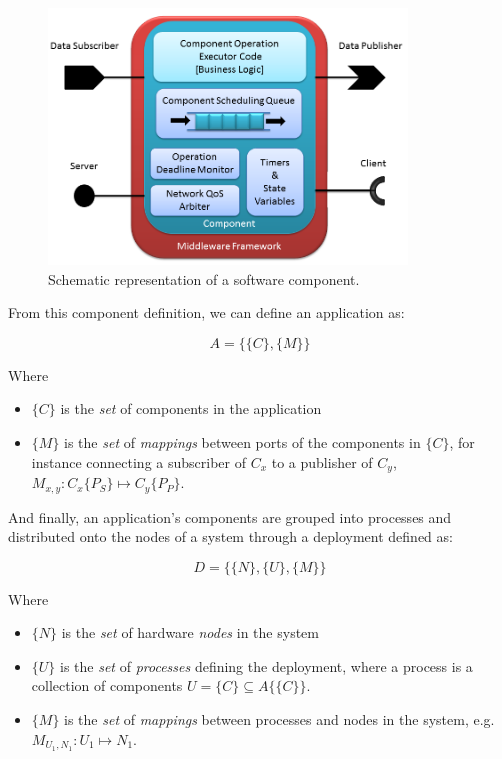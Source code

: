 \begin{figure}[ht!]
  \centering
  \includegraphics[width=0.85\textwidth]{../doc/src/images/results/ros_component.png}
  \caption{Schematic representation of a software component.}
  \label{fig:component}
\end{figure}

From this component definition, we can define an application as:

\begin{equation}
  A = \{\{C\},\{M\}\}
\end{equation}

Where

\begin{itemize}
\item $\{C\}$ is the \emph{set} of components in the application
\item $\{M\}$ is the \emph{set} of \emph{mappings} between ports of
  the components in $\{C\}$, for instance connecting a subscriber of
  $C_x$ to a publisher of $C_y$, $M_{x,y} : C_x\{P_S\}\mapsto
  C_y\{P_P\}$.
\end{itemize}

And finally, an application's components are grouped into processes
and distributed onto the nodes of a system through a deployment
defined as:

\begin{equation}
  D = \{\{N\},\{U\},\{M\}\}
\end{equation}

Where

\begin{itemize}
\item $\{N\}$ is the \emph{set} of hardware \emph{nodes} in the system
\item $\{U\}$ is the \emph{set} of \emph{processes} defining the deployment,
  where a process is a collection of components
  $U=\{C\}\subseteq A\{\{C\}\}$.
\item $\{M\}$ is the \emph{set} of \emph{mappings} between processes and nodes
  in the system, e.g. $M_{U_1,N_1} : U_1\mapsto N_1$.
\end{itemize}

